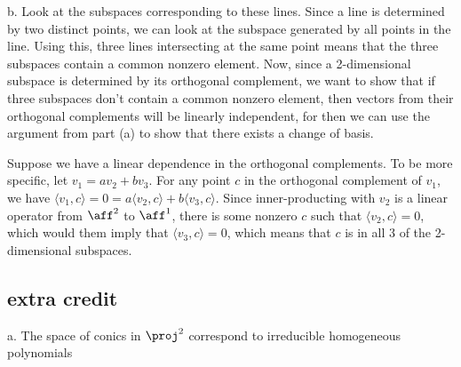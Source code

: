 \documentclass{article}
\begin{document}
b. Look at the subspaces corresponding to these lines. Since a line is determined by two distinct points, we can look at the subspace generated by all points in the line. Using this, three lines intersecting at the same point means that the three subspaces contain a common nonzero element. Now, since a 2-dimensional subspace is determined by its orthogonal complement, we want to show that if three subspaces don't contain a common nonzero element, then vectors from their orthogonal complements will be linearly independent, for then we can use the argument from part (a) to show that there exists a change of basis. 

Suppose we have a linear dependence in the orthogonal complements. To be more specific, let $v_1=av_2+bv_3$. For any point $c$ in the orthogonal complement of $v_1$, we have $\langle v_1,c\rangle=0=a\langle v_2,c\rangle+b\langle v_3,c\rangle$. Since inner-producting with $v_2$ is a linear operator from $\aff^2$ to $\aff^1$, there is some nonzero $c$ such that $\langle v_2,c\rangle=0$, which would them imply that $\langle v_3,c\rangle=0$, which means that $c$ is in all 3 of the 2-dimensional subspaces.
\subsection*{extra credit}
a. The space of conics in $\proj^2$ correspond to irreducible homogeneous polynomials
\end{document}
